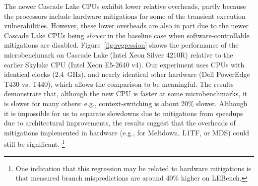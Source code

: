 The newer Cascade Lake CPUs exhibit lower relative overheads, partly
because the processors include hardware mitigations for some of the
transient execution vulnerabilities.  However, these lower overheads
are also in part due to the newer Cascade Lake CPUs being \emph{slower}
in the baseline case when software-controllable mitigations are disabled.
Figure~\ref{fig:regression} shows the performance of the microbenchmark
on Cascade Lake (Intel Xeon Silver 4210R) relative to the earlier
Skylake CPU (Intel Xeon E5-2640 v4).  Our experiment uses CPUs
with identical clocks (2.4~GHz), and nearly identical other hardware
(Dell PowerEdge T430 vs. T440), which allows the comparison to be
meaningful.  The results demonstrate that, although the new CPU is
faster at some microbenchmarks, it is slower for many others: e.g.,
context-switching is about 20\% slower.  Although it is impossible for us to
separate slowdowns due to mitigations from speedups due to architectural
improvements, the results suggest that the overheads of mitigations implemented
in hardware (e.g., for Meltdown, L1TF, or MDS) could still be significant.
\footnote{One indication that this regression may be related to hardware
  mitigations is that measured branch mispredictions are around 40\% higher on
  LEBench.}


